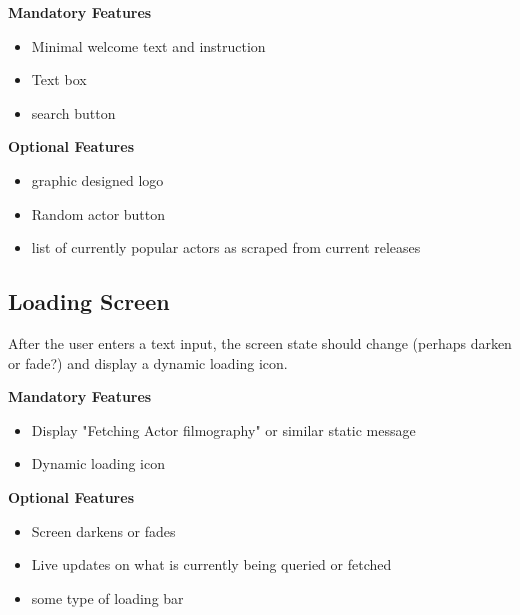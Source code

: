 \documentclass[12pt]{article}
\begin{document}
 \vspace{2em}
 
 \textbf{Mandatory Features}
 \begin{itemize}
  	\item Minimal welcome text and instruction
  	\item Text box
  	\item search button
 \end{itemize}

 \vspace{2em}
 \textbf{Optional Features}
\begin{itemize}
\item graphic designed logo
	\item Random actor button
	\item list of currently popular actors as scraped from current releases
\end{itemize}

\newpage

\subsection{Loading Screen}


 After the user enters a text input, the screen state should change (perhaps darken or fade?) and display a dynamic loading icon.
 
 \vspace{2em}
 
 \textbf{Mandatory Features}
 \begin{itemize}
  	\item Display "Fetching Actor filmography" or similar static message
  	\item Dynamic loading icon 
 \end{itemize}

 \vspace{2em}
 \textbf{Optional Features}
\begin{itemize}

	\item Screen darkens or fades	
	\item Live updates on what is currently being queried or fetched
	\item some type of loading bar
\end{itemize}
	
\newpage
\end{document}
